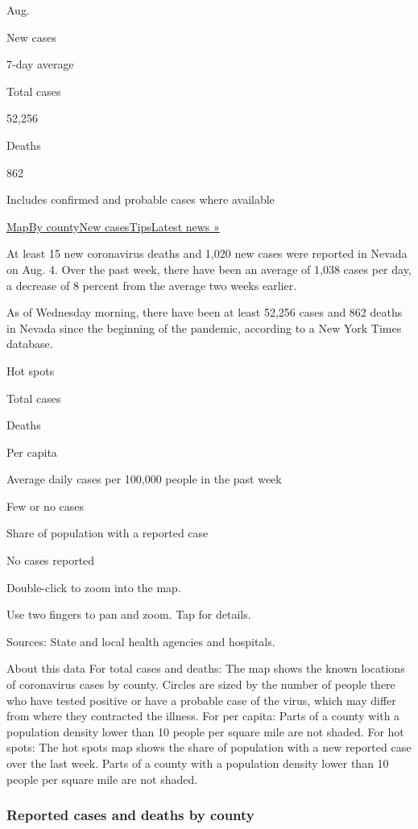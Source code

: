 Aug.

New cases

7-day average

Total cases

52,256

Deaths

862

Includes confirmed and probable cases where available

\protect\hyperlink{map}{Map}\protect\hyperlink{county}{By
county}\protect\hyperlink{cases}{New
cases}\protect\hyperlink{tips}{Tips}\href{https://www.nytimes.com/2020/08/04/world/coronavirus-covid-19.html}{Latest
news »}

At least 15 new coronavirus deaths and 1,020 new cases were reported in
Nevada on Aug. 4. Over the past week, there have been an average of
1,038 cases per day, a decrease of 8 percent from the average two weeks
earlier.

As of Wednesday morning, there have been at least 52,256 cases and 862
deaths in Nevada since the beginning of the pandemic, according to a New
York Times database.

Hot spots

Total cases

Deaths

Per capita

Average daily cases per 100,000 people in the past week

Few or no cases

Share of population with a reported case

No cases reported

Double-click to zoom into the map.

Use two fingers to pan and zoom. Tap for details.

Sources: State and local health agencies and hospitals.

About this data For total cases and deaths: The map shows the known
locations of coronavirus cases by county. Circles are sized by the
number of people there who have tested positive or have a probable case
of the virus, which may differ from where they contracted the illness.
For per capita: Parts of a county with a population density lower than
10 people per square mile are not shaded. For hot spots: The hot spots
map shows the share of population with a new reported case over the last
week. Parts of a county with a population density lower than 10 people
per square mile are not shaded.

\hypertarget{reported-cases-and-deaths-by-county}{%
\subsubsection{Reported cases and deaths by
county}\label{reported-cases-and-deaths-by-county}}

